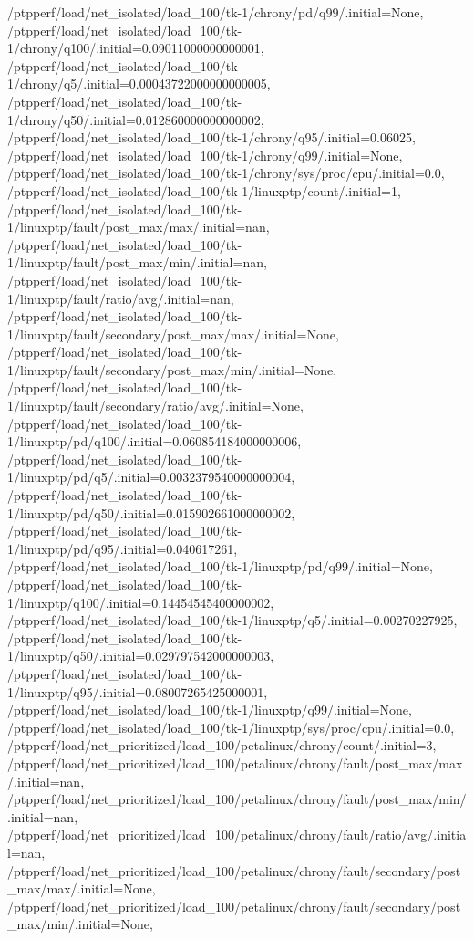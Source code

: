 {    /ptpperf/load/net_isolated/load_100/tk-1/chrony/pd/q99/.initial=None,
    /ptpperf/load/net_isolated/load_100/tk-1/chrony/q100/.initial=0.09011000000000001,
    /ptpperf/load/net_isolated/load_100/tk-1/chrony/q5/.initial=0.00043722000000000005,
    /ptpperf/load/net_isolated/load_100/tk-1/chrony/q50/.initial=0.012860000000000002,
    /ptpperf/load/net_isolated/load_100/tk-1/chrony/q95/.initial=0.06025,
    /ptpperf/load/net_isolated/load_100/tk-1/chrony/q99/.initial=None,
    /ptpperf/load/net_isolated/load_100/tk-1/chrony/sys/proc/cpu/.initial=0.0,
    /ptpperf/load/net_isolated/load_100/tk-1/linuxptp/count/.initial=1,
    /ptpperf/load/net_isolated/load_100/tk-1/linuxptp/fault/post_max/max/.initial=nan,
    /ptpperf/load/net_isolated/load_100/tk-1/linuxptp/fault/post_max/min/.initial=nan,
    /ptpperf/load/net_isolated/load_100/tk-1/linuxptp/fault/ratio/avg/.initial=nan,
    /ptpperf/load/net_isolated/load_100/tk-1/linuxptp/fault/secondary/post_max/max/.initial=None,
    /ptpperf/load/net_isolated/load_100/tk-1/linuxptp/fault/secondary/post_max/min/.initial=None,
    /ptpperf/load/net_isolated/load_100/tk-1/linuxptp/fault/secondary/ratio/avg/.initial=None,
    /ptpperf/load/net_isolated/load_100/tk-1/linuxptp/pd/q100/.initial=0.060854184000000006,
    /ptpperf/load/net_isolated/load_100/tk-1/linuxptp/pd/q5/.initial=0.0032379540000000004,
    /ptpperf/load/net_isolated/load_100/tk-1/linuxptp/pd/q50/.initial=0.015902661000000002,
    /ptpperf/load/net_isolated/load_100/tk-1/linuxptp/pd/q95/.initial=0.040617261,
    /ptpperf/load/net_isolated/load_100/tk-1/linuxptp/pd/q99/.initial=None,
    /ptpperf/load/net_isolated/load_100/tk-1/linuxptp/q100/.initial=0.14454545400000002,
    /ptpperf/load/net_isolated/load_100/tk-1/linuxptp/q5/.initial=0.00270227925,
    /ptpperf/load/net_isolated/load_100/tk-1/linuxptp/q50/.initial=0.029797542000000003,
    /ptpperf/load/net_isolated/load_100/tk-1/linuxptp/q95/.initial=0.08007265425000001,
    /ptpperf/load/net_isolated/load_100/tk-1/linuxptp/q99/.initial=None,
    /ptpperf/load/net_isolated/load_100/tk-1/linuxptp/sys/proc/cpu/.initial=0.0,
    /ptpperf/load/net_prioritized/load_100/petalinux/chrony/count/.initial=3,
    /ptpperf/load/net_prioritized/load_100/petalinux/chrony/fault/post_max/max/.initial=nan,
    /ptpperf/load/net_prioritized/load_100/petalinux/chrony/fault/post_max/min/.initial=nan,
    /ptpperf/load/net_prioritized/load_100/petalinux/chrony/fault/ratio/avg/.initial=nan,
    /ptpperf/load/net_prioritized/load_100/petalinux/chrony/fault/secondary/post_max/max/.initial=None,
    /ptpperf/load/net_prioritized/load_100/petalinux/chrony/fault/secondary/post_max/min/.initial=None,
}
